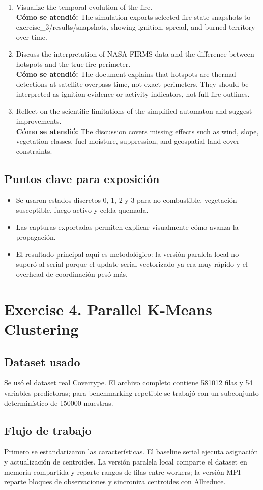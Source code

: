 \documentclass[11pt]{article}
\begin{document}
\begin{enumerate}[leftmargin=*]
\item Visualize the temporal evolution of the fire.\\
\textbf{Cómo se atendió:} The simulation exports selected fire-state snapshots to exercise\_3/results/snapshots, showing ignition, spread, and burned territory over time.
\item Discuss the interpretation of NASA FIRMS data and the difference between hotspots and the true fire perimeter.\\
\textbf{Cómo se atendió:} The document explains that hotspots are thermal detections at satellite overpass time, not exact perimeters. They should be interpreted as ignition evidence or activity indicators, not full fire outlines.
\item Reflect on the scientific limitations of the simplified automaton and suggest improvements.\\
\textbf{Cómo se atendió:} The discussion covers missing effects such as wind, slope, vegetation classes, fuel moisture, suppression, and geospatial land-cover constraints.
\end{enumerate}
\subsection*{Puntos clave para exposición}
\begin{itemize}[leftmargin=*]
\item Se usaron estados discretos 0, 1, 2 y 3 para no combustible, vegetación susceptible, fuego activo y celda quemada.
\item Las capturas exportadas permiten explicar visualmente cómo avanza la propagación.
\item El resultado principal aquí es metodológico: la versión paralela local no superó al serial porque el update serial vectorizado ya era muy rápido y el overhead de coordinación pesó más.
\end{itemize}
\section*{Exercise 4. Parallel K-Means Clustering}
\subsection*{Dataset usado}
Se usó el dataset real Covertype. El archivo completo contiene 581012 filas y 54 variables predictoras; para benchmarking repetible se trabajó con un subconjunto determinístico de 150000 muestras.
\subsection*{Flujo de trabajo}
Primero se estandarizaron las características. El baseline serial ejecuta asignación y actualización de centroides. La versión paralela local comparte el dataset en memoria compartida y reparte rangos de filas entre workers; la versión MPI reparte bloques de observaciones y sincroniza centroides con Allreduce.
\end{document}
